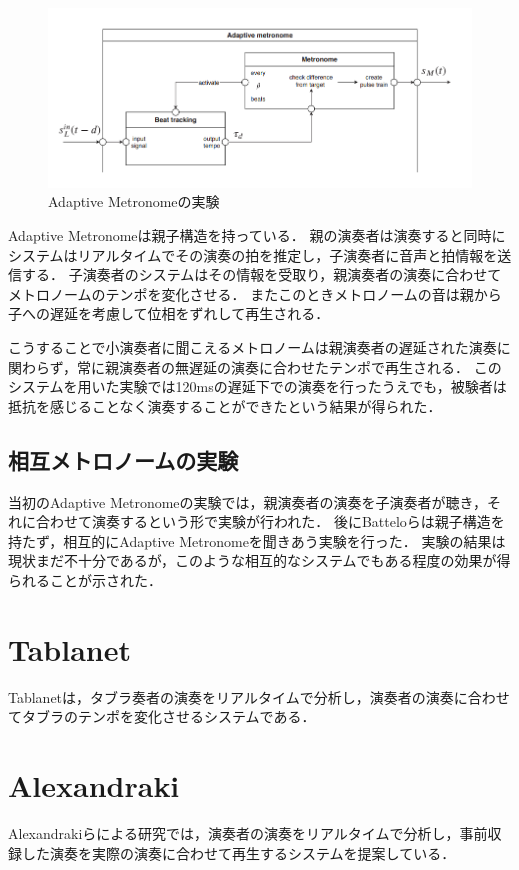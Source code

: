\begin{figure}[htbp]
  \centering
  \includegraphics[width=0.8\linewidth]{src/admet.png}
  \caption{Adaptive Metronomeの実験\cite{admet}}
  \label{fig:admet}
\end{figure}

Adaptive Metronomeは親子構造を持っている．
親の演奏者は演奏すると同時にシステムはリアルタイムでその演奏の拍を推定し，子演奏者に音声と拍情報を送信する．
子演奏者のシステムはその情報を受取り，親演奏者の演奏に合わせてメトロノームのテンポを変化させる．
またこのときメトロノームの音は親から子への遅延を考慮して位相をずれして再生される．

こうすることで小演奏者に聞こえるメトロノームは親演奏者の遅延された演奏に関わらず，常に親演奏者の無遅延の演奏に合わせたテンポで再生される．
このシステムを用いた実験では120msの遅延下での演奏を行ったうえでも，被験者は抵抗を感じることなく演奏することができたという結果が得られた．\cite{admet}

\subsection{相互メトロノームの実験}
当初のAdaptive Metronomeの実験では，親演奏者の演奏を子演奏者が聴き，それに合わせて演奏するという形で実験が行われた．
後にBatteloらは親子構造を持たず，相互的にAdaptive Metronomeを聞きあう実験を行った．
実験の結果は現状まだ不十分であるが，このような相互的なシステムでもある程度の効果が得られることが示された．

\section{Tablanet}
Tablanet\cite{tablanet}は，タブラ奏者の演奏をリアルタイムで分析し，演奏者の演奏に合わせてタブラのテンポを変化させるシステムである．
\section{Alexandraki}
Alexandrakiらによる研究\cite{alexandraki:2013}\cite{alexandraki:2014}では，演奏者の演奏をリアルタイムで分析し，事前収録した演奏を実際の演奏に合わせて再生するシステムを提案している．
